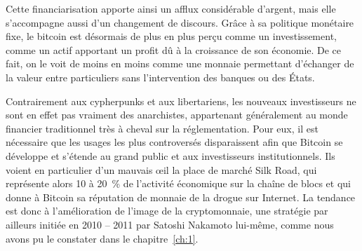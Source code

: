 Cette financiarisation apporte ainsi un afflux considérable d'argent, mais elle s'accompagne aussi d'un changement de discours. Grâce à sa politique monétaire fixe, le bitcoin est désormais de plus en plus perçu comme un investissement, comme un actif apportant un profit dû à la croissance de son économie. De ce fait, on le voit de moins en moins comme une monnaie permettant d'échanger de la valeur entre particuliers sans l'intervention des banques ou des États.

Contrairement aux cypherpunks et aux libertariens, les nouveaux investisseurs ne sont en effet pas vraiment des anarchistes, appartenant généralement au monde financier traditionnel très à cheval sur la réglementation. Pour eux, il est nécessaire que les usages les plus controversés disparaissent afin que Bitcoin se développe et s'étende au grand public et aux investisseurs institutionnels. Ils voient en particulier d'un mauvais œil la place de marché Silk Road, qui représente alors 10 à 20~\% de l'activité économique sur la chaîne de blocs et qui donne à Bitcoin sa réputation de monnaie de la drogue sur Internet. La tendance est donc à l'amélioration de l'image de la cryptomonnaie, une stratégie par ailleurs initiée en 2010 -- 2011 par Satoshi Nakamoto lui-même, comme nous avons pu le constater dans le chapitre~\ref{ch:1}.

